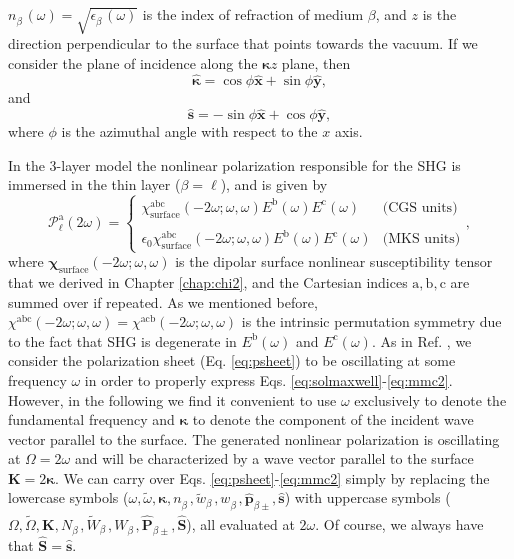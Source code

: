 $n^{\phantom{A}}_{\beta}(\omega)=\sqrt{\epsilon^{\phantom{A}}_{\beta}(\omega)}$
is the index of refraction of medium $\beta$, and $z$ is the direction
perpendicular to the surface that points towards the vacuum. If we consider the
plane of incidence along the $\boldsymbol{\kappa}z$ plane, then
\begin{equation}\label{eq:mc1}
\hat{\boldsymbol{\kappa}} = \cos\phi\hat{\mathbf{x}} + \sin\phi\hat{\mathbf{y}},
\end{equation}
and
\begin{equation}\label{eq:mmc2}
\hat{\mathbf{s}} = -\sin\phi\hat{\mathbf{x}} + \cos\phi\hat{\mathbf{y}},
\end{equation}
where $\phi$ is the azimuthal angle with respect to the $x$ axis.

In the 3-layer model the nonlinear polarization responsible for the SHG is
immersed in the thin layer ($\beta=\ell$), and is given by
\begin{equation}\label{eq:tres}
\mathcal{P}^{\mathrm{a}}_{\ell}(2\omega) =
\left\{
\begin{array}{cc}
\chi^{\mathrm{abc}}_{\mathrm{surface}}(-2\omega;\omega,\omega)
    E^{\mathrm{b}}(\omega)E^{\mathrm{c}}(\omega)
    & \text{(CGS units)}\\\\
\epsilon_{0}\chi^{\mathrm{abc}}_{\mathrm{surface}}(-2\omega;\omega,\omega)
    E^{\mathrm{b}}(\omega)E^{\mathrm{c}}(\omega)
    & \text{(MKS units)}
\end{array}
\right.,
\end{equation}
where $\boldsymbol{\chi}_{\mathrm{surface}}(-2\omega;\omega,\omega)$ is the
dipolar surface nonlinear susceptibility tensor that we derived in Chapter
\ref{chap:chi2}, and the Cartesian indices $\mathrm{a,b,c}$ are summed over if
repeated. As we mentioned before, $\chi^{\mathrm{abc}}(-2\omega;\omega,\omega) =
\chi^{\mathrm{acb}}(-2\omega;\omega,\omega)$ is the intrinsic permutation
symmetry due to the fact that SHG is degenerate in $E^{\mathrm{b}}(\omega)$ and
$E^{\mathrm{c}}(\omega)$. As in Ref. \cite{mizrahiJOSA88}, we consider the
polarization sheet (Eq. \eqref{eq:psheet}) to be oscillating at some frequency
$\omega$ in order to properly express Eqs.
\eqref{eq:solmaxwell}-\eqref{eq:mmc2}. However, in the following we find it
convenient to use $\omega$ exclusively to denote the fundamental frequency and
$\boldsymbol{\kappa}$ to denote the component of the incident wave vector
parallel to the surface. The generated nonlinear polarization is oscillating at
$\Omega = 2\omega$ and will be characterized by a wave vector parallel to the
surface $\mathbf{K} = 2\boldsymbol{\kappa}$. We can carry over Eqs.
\eqref{eq:psheet}-\eqref{eq:mmc2} simply by replacing the lowercase symbols
($\omega,\tilde{\omega},\boldsymbol{\kappa},n^{\phantom{A}}_{\beta},
\tilde{w}^{\phantom{A}}_{\beta},w^{\phantom{A}}_{\beta},
\hat{\mathbf{p}}^{\phantom{A}}_{\beta\pm},\hat{\mathbf{s}}$) with uppercase
symbols ($\Omega,\tilde{\Omega},\mathbf{K},N^{\phantom{A}}_{\beta},
\tilde{W}^{\phantom{A}}_{\beta},W^{\phantom{A}}_{\beta},
\hat{\mathbf{P}}_{\beta\pm},\hat{\mathbf{S}}$), all evaluated at $2\omega$. Of
course, we always have that $\hat{\mathbf{S}}=\hat{\mathbf{s}}$.

